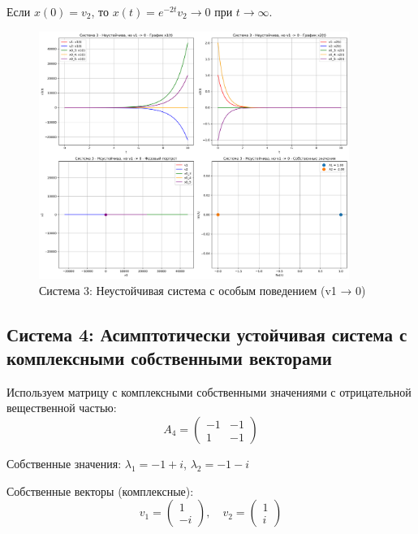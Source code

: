 Если $x(0) = v_2$, то $x(t) = e^{-2t}v_2 \to 0$ при $t \to \infty$.

\begin{figure}[h!]
\centering
\includegraphics[width=0.9\textwidth]{images/task1/система_3_-_неустойчива,_но_v1_->_0.png}
\caption{Система 3: Неустойчивая система с особым поведением (v1 → 0)}
\label{fig:system3}
\end{figure}

\subsection{Система 4: Асимптотически устойчивая система с комплексными собственными векторами}

Используем матрицу с комплексными собственными значениями с отрицательной вещественной частью:
\begin{equation}
A_4 = \begin{pmatrix} -1 & -1 \\ 1 & -1 \end{pmatrix}
\end{equation}

Собственные значения: $\lambda_1 = -1 + i$, $\lambda_2 = -1 - i$

Собственные векторы (комплексные):
\begin{equation}
v_1 = \begin{pmatrix} 1 \\ -i \end{pmatrix}, \quad v_2 = \begin{pmatrix} 1 \\ i \end{pmatrix}
\end{equation}

